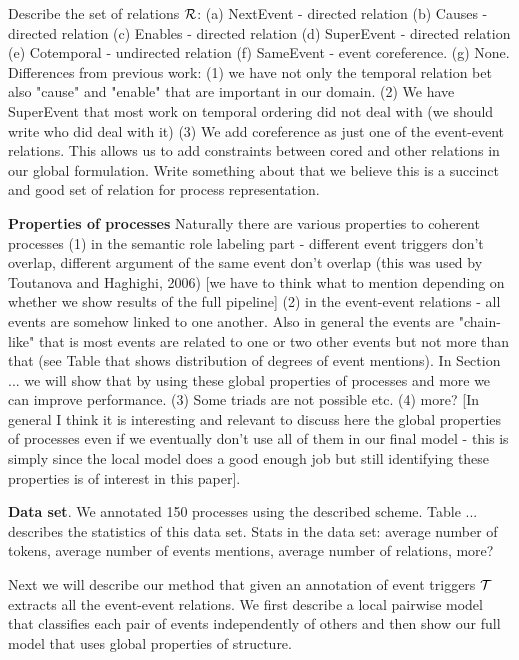 Describe the set of relations $\mathcal{R}$: (a) NextEvent - directed relation (b) Causes - directed relation (c) Enables - directed relation (d) SuperEvent - directed relation (e) Cotemporal - undirected relation (f) SameEvent - event coreference. (g) None. Differences from previous work: (1) we have not only the temporal relation bet also "cause" and "enable" that are important in our domain. (2) We have SuperEvent that most work on temporal ordering did not deal with (we should write who did deal with it) (3) We add coreference as just one of the event-event relations. This allows us to add constraints between cored and other relations in our global formulation. Write something about that  we believe this is a succinct and good set of relation for process representation.

\textbf{Properties of processes} Naturally there are various properties to coherent processes (1) in the semantic role labeling part - different event triggers don't overlap, different argument of the same event don't overlap (this was used by Toutanova and Haghighi, 2006) [we have to think what to mention depending on whether we show results of the full pipeline] (2) in the event-event relations - all events are somehow linked to one another. Also in general the events are "chain-like" that is most events are related to one or two other events but not more than that (see Table that shows distribution of degrees of event mentions). In Section ... we will show that by using these global properties of processes and more we can improve performance. (3) Some triads are not possible etc. (4) more? [In general I think it is interesting and relevant to discuss here the global properties of processes even if we eventually don't use all of them in our final model - this is simply since the local model does a good enough job but still identifying these properties is of interest in this paper].

\textbf{Data set}. We annotated 150 processes using the described scheme. Table ... describes the statistics of this data set. 
Stats in the data set: average number of tokens, average number of events mentions, average number of relations, more?

Next we will describe our method that given an annotation of event triggers $\mathcal{T}$ extracts all the event-event relations. We first describe a local pairwise model that classifies each pair of events independently of others and then show our full model that uses global properties of structure.